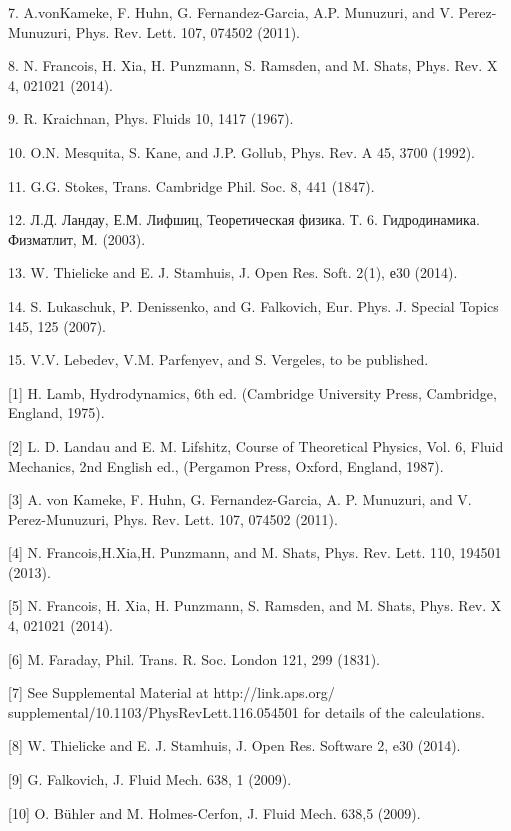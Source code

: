 \begin{thebibliography}{99}
7. A.vonKameke, F. Huhn, G. Fernandez-Garcia, A.P. Munuzuri, and V. Perez-Munuzuri, Phys. Rev. Lett. 107, 074502 (2011).

8. N. Francois, H. Xia, H. Punzmann, S. Ramsden, and M. Shats, Phys. Rev. X 4, 021021 (2014).

9. R. Kraichnan, Phys. Fluids 10, 1417 (1967).

10. O.N. Mesquita, S. Kane, and J.P. Gollub, Phys. Rev. A 45, 3700 (1992).

11. G.G. Stokes, Trans. Cambridge Phil. Soc. 8, 441 (1847).

12. Л.Д. Ландау, Е.М. Лифшиц, Теоретическая физика. Т. 6. Гидродинамика. Физматлит, М. (2003).

13. W. Thielicke and E. J. Stamhuis, J. Open Res. Soft. 2(1), е30 (2014).

14. S. Lukaschuk, P. Denissenko, and G. Falkovich, Eur. Phys. J. Special Topics 145, 125 (2007).

15. V.V. Lebedev, V.M. Parfenyev, and S. Vergeles, to be published.

[1] H. Lamb, Hydrodynamics, 6th ed. (Cambridge University Press, Cambridge, England, 1975).

[2] L. D. Landau and E. M. Lifshitz, Course of Theoretical Physics, Vol. 6, Fluid Mechanics, 2nd English ed., (Pergamon Press, Oxford, England, 1987).

[3] A. von Kameke, F. Huhn, G. Fernandez-Garcia, A. P. Munuzuri, and V. Perez-Munuzuri, Phys. Rev. Lett. 107, 074502 (2011).

[4] N. Francois,H.Xia,H. Punzmann, and M. Shats, Phys. Rev. Lett. 110, 194501 (2013).

[5] N. Francois, H. Xia, H. Punzmann, S. Ramsden, and M. Shats, Phys. Rev. X 4, 021021 (2014).

[6] M. Faraday, Phil. Trans. R. Soc. London 121, 299 (1831).

[7] See Supplemental Material at http://link.aps.org/
supplemental/10.1103/PhysRevLett.116.054501 for details of the calculations.

[8] W. Thielicke and E. J. Stamhuis, J. Open Res. Software 2, e30 (2014).

[9] G. Falkovich, J. Fluid Mech. 638, 1 (2009).

[10] O. Bühler and M. Holmes-Cerfon, J. Fluid Mech. 638,5 (2009).


\end{thebibliography}
